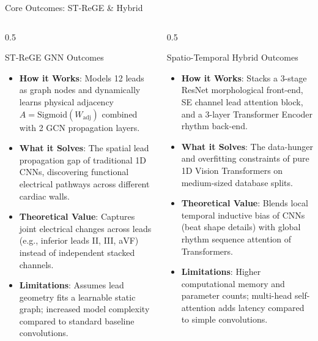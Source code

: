 \documentclass[11pt,aspectratio=169]{beamer}
\begin{document}
\begin{frame}{Core Outcomes: ST-ReGE \& Hybrid}
    \begin{columns}[T]
        \begin{column}{0.5\textwidth}
            \begin{block}{ST-ReGE GNN Outcomes}
                \fontsize{7.5}{9.5}\selectfont
                \begin{itemize}
                    \item \textbf{How it Works}: Models 12 leads as graph nodes and dynamically learns physical adjacency $A = \text{Sigmoid}(W_{\text{adj}})$ combined with 2 GCN propagation layers.
                    \item \textbf{What it Solves}: The spatial lead propagation gap of traditional 1D CNNs, discovering functional electrical pathways across different cardiac walls.
                    \item \textbf{Theoretical Value}: Captures joint electrical changes across leads (e.g., inferior leads II, III, aVF) instead of independent stacked channels.
                    \item \textbf{Limitations}: Assumes lead geometry fits a learnable static graph; increased model complexity compared to standard baseline convolutions.
                \end{itemize}
            \end{block}
        \end{column}
        \begin{column}{0.5\textwidth}
            \begin{block}{Spatio-Temporal Hybrid Outcomes}
                \fontsize{7.5}{9.5}\selectfont
                \begin{itemize}
                    \item \textbf{How it Works}: Stacks a 3-stage ResNet morphological front-end, SE channel lead attention block, and a 3-layer Transformer Encoder rhythm back-end.
                    \item \textbf{What it Solves}: The data-hunger and overfitting constraints of pure 1D Vision Transformers on medium-sized database splits.
                    \item \textbf{Theoretical Value}: Blends local temporal inductive bias of CNNs (beat shape details) with global rhythm sequence attention of Transformers.
                    \item \textbf{Limitations}: Higher computational memory and parameter counts; multi-head self-attention adds latency compared to simple convolutions.
                \end{itemize}
            \end{block}
        \end{column}
    \end{columns}
\end{frame}
\end{document}
